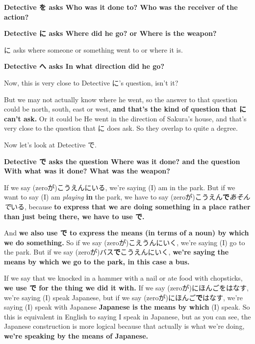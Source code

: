 \stopsectionlevel

\startsectionlevel[title={Particles を, に, へ},reference={particles-を-に-へ}]

{\bf Detective を asks Who was it done to? Who was the receiver of the action?}

{\bf Detective に asks Where did he go? or Where is the weapon?}

に asks where someone or something went to or where it is.

{\bf Detective へ asks In what direction did he go?}

Now, this is very close to Detective に's question, isn't it?

But we may not actually know where he went, so the answer to that question could be north, south, east or west, {\bf and that's the kind of question that に can't ask.} Or it could be He went in the direction of Sakura's house, and that's very close to the question that に does ask. So they overlap to quite a degree.

\stopsectionlevel

\startsectionlevel[title={Particle で},reference={particle-で}]

Now let's look at Detective で.

{\bf Detective で asks the question Where was it done? and the question With what was it done? What was the weapon?}

{}

If we say (zeroが)こうえんにいる, we're saying (I) am in the park. But if we want to say (I) am {\em playing} {\bf in} the park, we have to say (zeroが)こうえん{\bf で}{\em あそんで}いる, because {\bf to express that we are doing something in a place rather than just being there, we have to use で.}

{}

And {\bf we also use で to express the means (in terms of a noun) by which we do something.} So if we say (zeroが)こえうんにいく, we're saying (I) go to the park. But if we say (zeroが)バス{\bf で}こうえんにいく, {\bf we're saying the means by which we go to the park, in this case a bus.}

{}

If we say that we knocked in a hammer with a nail or ate food with chopsticks, {\bf we use で for the thing we did it with.} If we say (zeroが)にほんごをはなす, we're saying (I) speak Japanese, but if we say (zeroが)にほんご{\bf で}はなす, we're saying (I) speak with Japanese {\bf Japanese is the means by which} (I) speak. So this is equivalent in English to saying I speak in Japanese, but as you can see, the Japanese construction is more logical because that actually is what we're doing, {\bf we're speaking by the means of Japanese.}

